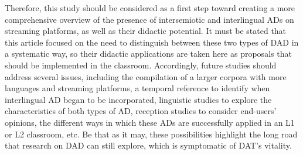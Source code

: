 \documentclass[english]{textolivre}
\begin{document}
Therefore, this study should be considered as a first step toward creating a more comprehensive overview of the presence of intersemiotic and interlingual ADs on streaming platforms, as well as their didactic potential. It must be stated that this article focused on the need to distinguish between these two types of DAD in a systematic way, so their didactic applications are taken here as proposals that should be implemented in the classroom. Accordingly, future studies should address several issues, including the compilation of a larger corpora with more languages and streaming platforms, a temporal reference to identify when interlingual AD began to be incorporated, linguistic studies to explore the characteristics of both types of AD, reception studies to consider end-users’ opinions, the different ways in which these ADs are successfully applied in an L1 or L2 classroom, etc. Be that as it may, these possibilities highlight the long road that research on DAD can still explore, which is symptomatic of DAT’s vitality.


\printbibliography\label{sec-bib}
\end{document}
